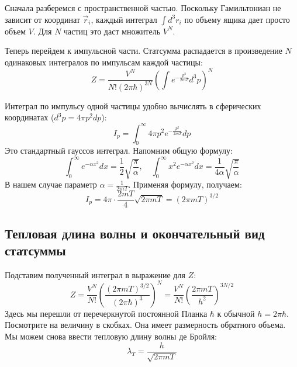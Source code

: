 \documentclass[../general/general]{subfiles}
\begin{document}
Сначала разберемся с пространственной частью. Поскольку Гамильтониан не зависит от координат $\vec{r}_i$, каждый интеграл $\int d^3r_i$ по объему ящика дает просто объем $V$. Для $N$ частиц это даст множитель $V^N$.

Теперь перейдем к импульсной части. Статсумма распадается в произведение $N$ одинаковых интегралов по импульсам каждой частицы:
\begin{equation}
Z = \frac{V^N}{N! (2\pi\hbar)^{3N}} \left( \int e^{-\frac{p^2}{2mT}} d^3p \right)^N
\end{equation}

Интеграл по импульсу одной частицы удобно вычислять в сферических координатах ($d^3p = 4\pi p^2 dp$):
\begin{equation}
I_p = \int_0^\infty 4\pi p^2 e^{-\frac{p^2}{2mT}} dp
\end{equation}
Это стандартный гауссов интеграл. Напомним общую формулу:
\begin{equation}
\int_0^\infty e^{-\alpha x^2} dx = \frac{1}{2} \sqrt{\frac{\pi}{\alpha}}, \quad \int_0^\infty x^2 e^{-\alpha x^2} dx = \frac{1}{4\alpha} \sqrt{\frac{\pi}{\alpha}}
\end{equation}
В нашем случае параметр $\alpha = \frac{1}{2mT}$. Применяя формулу, получаем:
\begin{equation}
I_p = 4\pi \cdot \frac{2mT}{4} \sqrt{2\pi mT} = (2\pi mT)^{3/2}
\end{equation}

\subsection{Тепловая длина волны и окончательный вид статсуммы}

Подставим полученный интеграл в выражение для $Z$:
\begin{equation}
Z = \frac{V^N}{N!} \left( \frac{(2\pi mT)^{3/2}}{(2\pi\hbar)^3} \right)^N = \frac{V^N}{N!} \left( \frac{2\pi mT}{h^2} \right)^{3N/2}
\end{equation}
Здесь мы перешли от перечеркнутой постоянной Планка $\hbar$ к обычной $h = 2\pi\hbar$. Посмотрите на величину в скобках. Она имеет размерность обратного объема. Мы можем снова ввести тепловую длину волны де Бройля:
\begin{equation}
\lambda_T = \frac{h}{\sqrt{2\pi mT}}
\end{equation}

\end{document}
